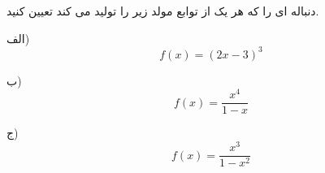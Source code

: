 \exercise
دنباله ای را که هر یک از توابع مولد زیر را تولید می کند تعیین کنید.

الف)
$$f(x) = (2x - 3)^3$$

ب)
$$f(x) = \frac{x^4}{1-x}$$

ج)
$$f(x) = \frac{x^3}{1 - x^2}$$